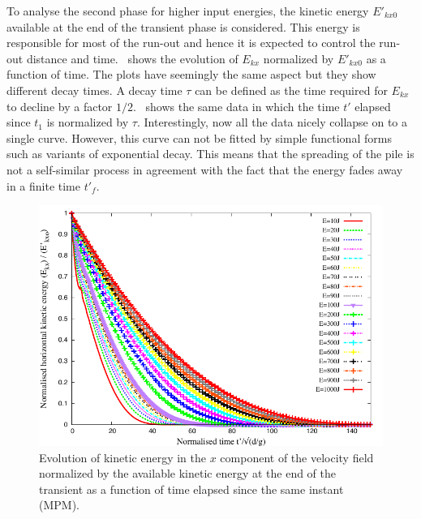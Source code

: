 To analyse the second phase for higher input energies, the 
kinetic energy $E'_{kx0}$ available at the end of the transient phase is 
considered. This energy is responsible for most of the run-out and hence it is 
expected to 
control the run-out distance and time.~ 
shows the evolution of $E_{kx}$ normalized by $E'_{kx0}$ as a function of time. 
The plots have seemingly the same aspect but they show different decay times. A 
decay time $\tau$ can be defined as the time required for $E_{kx}$ to decline 
by a factor $1/2$.~ shows the same data in 
which the time $t'$ elapsed since $t_1$ is normalized by $\tau$. Interestingly, 
now all the data nicely collapse on to a single curve. However, this curve can 
not be fitted by simple functional forms such as variants of exponential decay. 
This means that the spreading of the pile is not a self-similar process in 
agreement with the fact that the energy fades away in a finite time $t'_f$. 

\begin{figure}[tbhp]
\centering
\includegraphics[width=\textwidth]{Normalised_KExExop_Slope}
\caption{Evolution of kinetic energy in the $x$ component of the
velocity field normalized by the available kinetic energy at the
end of the transient as a function of time elapsed since the
same instant (MPM).}
\label{fig:Normalised_KExExop_Slope}
\end{figure}

